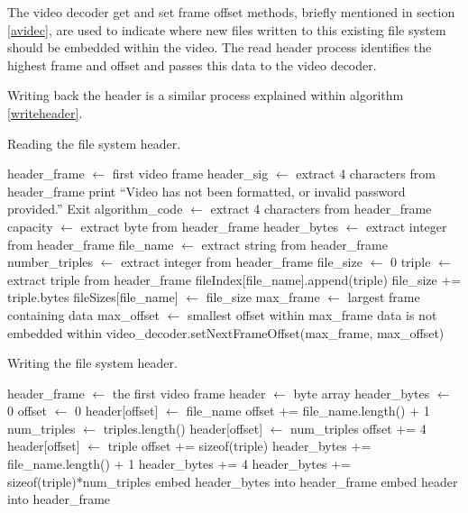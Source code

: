 \documentclass[paper=a4, fontsize=11pt,twoside]{scrartcl}
\numberwithin{table}{section}
\numberwithin{figure}{section}
\numberwithin{algorithm}{section}
\begin{document}
The video decoder get and set frame offset methods, briefly mentioned in section \ref{avidec}, are used to indicate where new files written to this existing file system should be embedded within the video. The read header process identifies the highest frame and offset and passes this data to the video decoder.

Writing back the header is a similar process explained within algorithm \ref{writeheader}.

\begin{algorithm}
\caption{Reading the file system header.}
\label{readheader}
\begin{algorithmic}[1]
\State header\_frame $\gets$ first video frame
\State header\_sig $\gets$ extract 4 characters from header\_frame
	\State print ``Video has not been formatted, or invalid password provided.''
	\State Exit
\EndIf
\State algorithm\_code $\gets$ extract 4 characters from header\_frame
\State capacity $\gets$ extract byte from header\_frame
\State header\_bytes $\gets$ extract integer from header\_frame
	\State file\_name $\gets$ extract string from header\_frame
	\State number\_triples $\gets$ extract integer from header\_frame
	\State file\_size $\gets$ 0	
		\State triple $\gets$ extract triple from header\_frame
		\State fileIndex[file\_name].append(triple)
		\State file\_size += triple.bytes
	\EndFor
	\State fileSizes[file\_name] $\gets$ file\_size
\EndWhile
\State max\_frame $\gets$ largest frame containing data
\State max\_offset $\gets$ smallest offset within max\_frame data is not embedded within
\State video\_decoder.setNextFrameOffset(max\_frame, max\_offset)
\end{algorithmic}
\end{algorithm}

\begin{algorithm}
\caption{Writing the file system header.}
\label{writeheader}
\begin{algorithmic}[1]
\State header\_frame $\gets$ the first video frame
\State header $\gets$ byte array
\State header\_bytes $\gets$ 0
\State offset $\gets$ 0
	\State header[offset] $\gets$ file\_name
	\State offset += file\_name.length() + 1
	\State num\_triples $\gets$ triples.length()
	\State header[offset] $\gets$ num\_triples
	\State offset += 4
		\State header[offset] $\gets$ triple
		\State offset += sizeof(triple)
	\EndFor
	\State header\_bytes += file\_name.length() + 1
	\State header\_bytes += 4
	\State header\_bytes += sizeof(triple)*num\_triples
\EndFor
\State embed header\_bytes into header\_frame
\State embed header into header\_frame
\end{algorithmic}
\end{algorithm}
\end{document}
